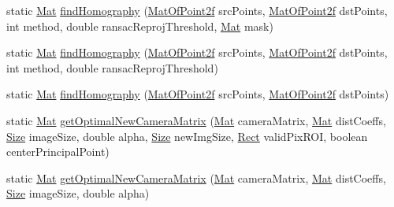 \begin{DoxyCompactItemize}
\item 
static \mbox{\hyperlink{classorg_1_1opencv_1_1core_1_1_mat}{Mat}} \mbox{\hyperlink{classorg_1_1opencv_1_1calib3d_1_1_calib3d_a2c32d44d2f35dc41aa09d54eb6829ab8}{find\+Homography}} (\mbox{\hyperlink{classorg_1_1opencv_1_1core_1_1_mat_of_point2f}{Mat\+Of\+Point2f}} src\+Points, \mbox{\hyperlink{classorg_1_1opencv_1_1core_1_1_mat_of_point2f}{Mat\+Of\+Point2f}} dst\+Points, int method, double ransac\+Reproj\+Threshold, \mbox{\hyperlink{classorg_1_1opencv_1_1core_1_1_mat}{Mat}} mask)
\item 
static \mbox{\hyperlink{classorg_1_1opencv_1_1core_1_1_mat}{Mat}} \mbox{\hyperlink{classorg_1_1opencv_1_1calib3d_1_1_calib3d_ad95dde1b1f976545692c0fc8b11d2c22}{find\+Homography}} (\mbox{\hyperlink{classorg_1_1opencv_1_1core_1_1_mat_of_point2f}{Mat\+Of\+Point2f}} src\+Points, \mbox{\hyperlink{classorg_1_1opencv_1_1core_1_1_mat_of_point2f}{Mat\+Of\+Point2f}} dst\+Points, int method, double ransac\+Reproj\+Threshold)
\item 
static \mbox{\hyperlink{classorg_1_1opencv_1_1core_1_1_mat}{Mat}} \mbox{\hyperlink{classorg_1_1opencv_1_1calib3d_1_1_calib3d_aa3e6fd7652b2fc4c4d19064b39523dae}{find\+Homography}} (\mbox{\hyperlink{classorg_1_1opencv_1_1core_1_1_mat_of_point2f}{Mat\+Of\+Point2f}} src\+Points, \mbox{\hyperlink{classorg_1_1opencv_1_1core_1_1_mat_of_point2f}{Mat\+Of\+Point2f}} dst\+Points)
\item 
static \mbox{\hyperlink{classorg_1_1opencv_1_1core_1_1_mat}{Mat}} \mbox{\hyperlink{classorg_1_1opencv_1_1calib3d_1_1_calib3d_aaece56f4a02759da9d1e31d9269e6596}{get\+Optimal\+New\+Camera\+Matrix}} (\mbox{\hyperlink{classorg_1_1opencv_1_1core_1_1_mat}{Mat}} camera\+Matrix, \mbox{\hyperlink{classorg_1_1opencv_1_1core_1_1_mat}{Mat}} dist\+Coeffs, \mbox{\hyperlink{classorg_1_1opencv_1_1core_1_1_size}{Size}} image\+Size, double alpha, \mbox{\hyperlink{classorg_1_1opencv_1_1core_1_1_size}{Size}} new\+Img\+Size, \mbox{\hyperlink{classorg_1_1opencv_1_1core_1_1_rect}{Rect}} valid\+Pix\+R\+OI, boolean center\+Principal\+Point)
\item 
static \mbox{\hyperlink{classorg_1_1opencv_1_1core_1_1_mat}{Mat}} \mbox{\hyperlink{classorg_1_1opencv_1_1calib3d_1_1_calib3d_a6a86093a8d328292e60c8592ac5d7b22}{get\+Optimal\+New\+Camera\+Matrix}} (\mbox{\hyperlink{classorg_1_1opencv_1_1core_1_1_mat}{Mat}} camera\+Matrix, \mbox{\hyperlink{classorg_1_1opencv_1_1core_1_1_mat}{Mat}} dist\+Coeffs, \mbox{\hyperlink{classorg_1_1opencv_1_1core_1_1_size}{Size}} image\+Size, double alpha)
\item 

\end{DoxyCompactItemize}
